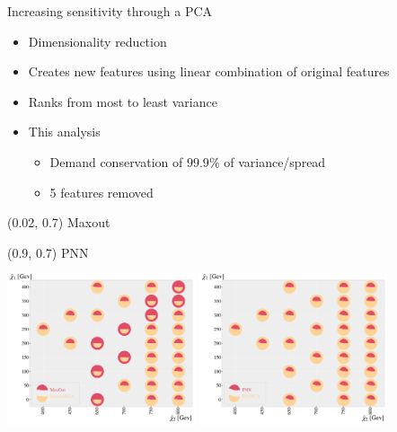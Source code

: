 \documentclass[UKenglish]{beamer}
\begin{document}
\begin{frame}{Increasing sensitivity through a PCA}
    \begin{itemize}
        \item Dimensionality reduction
        \item Creates new features using linear combination of original features
        \item Ranks from most to least variance
        \item This analysis
        \begin{itemize}
            \item Demand conservation of $99.9\%$ of variance/spread
            \item 5 features removed
        \end{itemize}
    \end{itemize}
    \begin{textblock}{0.8}(0.02, 0.7)
        {Maxout}
    \end{textblock}
    \begin{textblock}{0.8}(0.9, 0.7)
        {PNN}
    \end{textblock}
    \vfill
    \begin{center}
        \includegraphics[width=0.415\textwidth]{figures/Comps/MaxOutPCANetworkComp.pdf}
        \includegraphics[width=0.415\textwidth]{figures/Comps/PNNPCANetworkComp.pdf}
    \end{center}
\end{frame}
\end{document}
